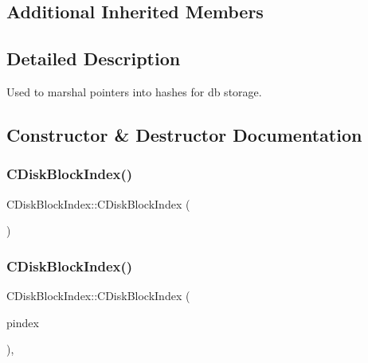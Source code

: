 \subsection*{Additional Inherited Members}


\subsection{Detailed Description}
Used to marshal pointers into hashes for db storage. 

\subsection{Constructor \& Destructor Documentation}
\mbox{\label{class_c_disk_block_index_a8c460c63b799964ef55e2dbbb74b5ad6}} 
\subsubsection{\texorpdfstring{C\+Disk\+Block\+Index()}{CDiskBlockIndex()}\hspace{0.1cm}{\footnotesize\ttfamily [1/2]}}
{\footnotesize\ttfamily C\+Disk\+Block\+Index\+::\+C\+Disk\+Block\+Index (\begin{DoxyParamCaption}{ }\end{DoxyParamCaption})\hspace{0.3cm}{\ttfamily [inline]}}

\mbox{\label{class_c_disk_block_index_a8d76af0058fa72d3d8ff688d27d2a5c9}} 
\subsubsection{\texorpdfstring{C\+Disk\+Block\+Index()}{CDiskBlockIndex()}\hspace{0.1cm}{\footnotesize\ttfamily [2/2]}}
{\footnotesize\ttfamily C\+Disk\+Block\+Index\+::\+C\+Disk\+Block\+Index (\begin{DoxyParamCaption}\item[{const \mbox{\hyperlink{class_c_block_index}{C\+Block\+Index}} $\ast$}]{pindex }\end{DoxyParamCaption})\hspace{0.3cm}{\ttfamily [inline]}, {\ttfamily [explicit]}}



